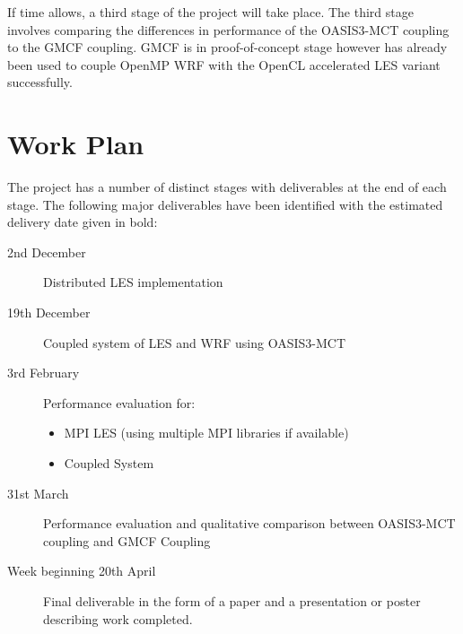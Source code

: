 \documentclass{acm_proc_article-sp}
\renewcommand{\_}{\underscore\hspace{0pt}}
\begin{document}
If time allows, a third stage of the project will take place. The third stage
involves comparing the differences in performance of the OASIS3-MCT coupling to
the GMCF coupling. GMCF is in proof-of-concept stage however has already been
used to couple OpenMP WRF with the OpenCL accelerated LES variant successfully.

\section*{Work Plan}

The project has a number of distinct stages with deliverables at the end of each
stage. The following major deliverables have been identified with the estimated
delivery date given in bold:

\begin{description}
	\item[2nd December] Distributed LES implementation
	\item[19th December] Coupled system of LES and WRF using OASIS3-MCT
	\item[3rd February] Performance evaluation for:
    \begin{itemize}
        \item MPI LES (using multiple MPI libraries if available)
        \item Coupled System
    \end{itemize}
	\item[31st March] Performance evaluation and qualitative comparison between
    OASIS3-MCT coupling and GMCF Coupling
    \item[Week beginning 20th April] Final deliverable in the form of a paper
    and a presentation or poster describing work completed.
\end{description}



\end{document}
